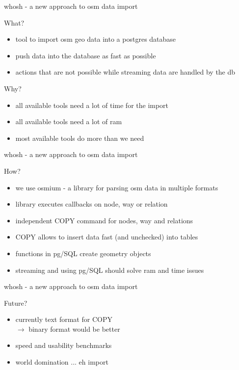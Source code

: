 \begin{frame} {whosh - a new approach to osm data import}
    \begin{block}{What?}
        \begin{itemize}
        \item tool to import osm geo data into a postgres database
        \item push data into the database as fast as possible
        \item actions that are not possible while streaming data are handled by the db
        \end{itemize}
    \end{block}
    \begin{block}{Why?}
        \begin{itemize}
        \item all available tools need a lot of time for the import
        \item all available tools need a lot of ram
        \item most available tools do more than we need
        \end{itemize}
    \end{block}
\end{frame}

\begin{frame} {whosh - a new approach to osm data import}
    \begin{block}{How?}
        \begin{itemize}
        \item we use osmium - a library for parsing osm data in multiple formats
        \item library executes callbacks on node, way or relation
        \item independent COPY command for nodes, way and relations
        \item COPY allows to insert data fast (and unchecked) into tables
        \item functions in pg/SQL create geometry objects
        \item streaming and using pg/SQL should solve ram and time issues
        \end{itemize}
    \end{block}    
\end{frame}

\begin{frame} {whosh - a new approach to osm data import}
    \begin{block}{Future?}
        \begin{itemize}
        \item currently text format for COPY \\
        $\rightarrow$ binary format would be better
        \item speed and usability benchmarks
        \item world domination ... eh import
        \end{itemize}
    \end{block}    
\end{frame}
